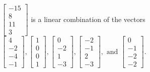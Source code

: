\begin{exercise}
\begin{exerciseStatement}
  \end{exerciseStatement}
  \begin{exerciseAnswer}
   \(\left[\begin{array}{c}
-15 \\
8 \\
11 \\
3
\end{array}\right]\) 
  	 is  
	a linear combination of the vectors \(\left[\begin{array}{c}
4 \\
-2 \\
-4 \\
-1
\end{array}\right] , \left[\begin{array}{c}
1 \\
0 \\
0 \\
1
\end{array}\right] , \left[\begin{array}{c}
0 \\
-2 \\
1 \\
-3
\end{array}\right] , \left[\begin{array}{c}
-2 \\
-1 \\
2 \\
-3
\end{array}\right] , \text{ and } \left[\begin{array}{c}
0 \\
-1 \\
-2 \\
-2
\end{array}\right]\).

	
  


  \end{exerciseAnswer}
\end{exercise}